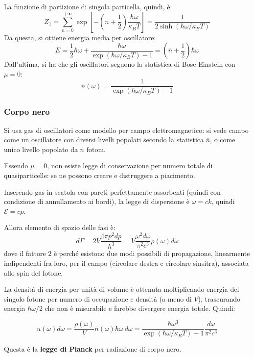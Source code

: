 \documentclass[10pt, a4paper]{scrartcl}
\numberwithin{equation}{subsection}
\theoremstyle{style1}
\newenvironment{boxenv}[1][]{
    \begin{eqbox}[#1]
    }{
   \end{eqbox}
}
\begin{document}
La funzione di partizione di singola particella, quindi, \`e:
\begin{equation}
	Z_1 = \sum_{n=0}^{+\infty} \exp \left[ - \left(n + \frac{1}{2}\right) \frac{\hbar \omega}{\kappa _B T} \right] = \frac{1}{2 \operatorname{sinh}(\hbar  \omega / \kappa _B T) }
\end{equation}
Da questa, si ottiene energia media per oscillatore:
\begin{equation}
	E = \frac{1}{2}\hbar  \omega + \frac{\hbar  \omega}{\exp(\hbar \omega / \kappa _B T) - 1} = \left(\overline{n} + \frac{1}{2}\right) \hbar \omega
\end{equation}
Dall'ultima, si ha che gli oscillatori seguono la statistica di Bose-Einstein con $\mu =0$:
\begin{equation}
	\overline{n}(\omega) = \frac{1}{\exp(\hbar \omega / \kappa _B T) - 1}
\end{equation}
\subsubsection{Corpo nero}
Si usa gas di oscillatori come modello per campo elettromagnetico: si vede campo come un oscillatore con diversi livelli popolati secondo la statistica $\overline{n}$, o come unico livello popolato da $\overline{n}$ fotoni.

Essendo $\mu  =0 $, non esiste legge di conservazione per numero totale di quasiparticelle: se ne possono creare e distruggere a piacimento.

Inserendo gas in scatola con pareti perfettamente assorbenti (quindi con condizione di annullamento ai bordi), la legge di dispersione \`e $\omega = ck$, quindi $\mathscr{E} = cp$.

Allora elemento di spazio delle fasi \`e:
\begin{equation}
	d\Gamma = 2V \frac{4 \pi p^2 dp}{h^3} = V \frac{\omega^2 d\omega }{\pi^2 c^3} \rho (\omega) d\omega
\end{equation}
dove il fattore $2$ \`e perch\'e esistono due modi possibili di propagazione, linearmente indipendenti fra loro, per il campo (circolare destra e circolare sinsitra), associata allo spin del fotone.

La densit\`a di energia per unit\`a di volume \`e ottenuta moltiplicando energia del singolo fotone per numero di occupazione e densit\`a (a meno di $V$), trascurando energia $\hbar  \omega / 2$ che non \`e misurabile e farebbe divergere energia totale. 
Quindi:
\begin{boxenv}[]
\begin{equation}
	u(\omega ) d\omega = \frac{\rho (\omega)}{V} \overline{n}(\omega) \hbar \omega \ d\omega= \frac{\hbar  \omega^3}{\exp(\hbar \omega / \kappa _B T ) - 1} \frac{d\omega}{\pi^2 c^3}
\end{equation}
\end{boxenv}
\noindent Questa \`e la \textbf{legge di Planck} per radiazione di corpo nero. 
\end{document}
